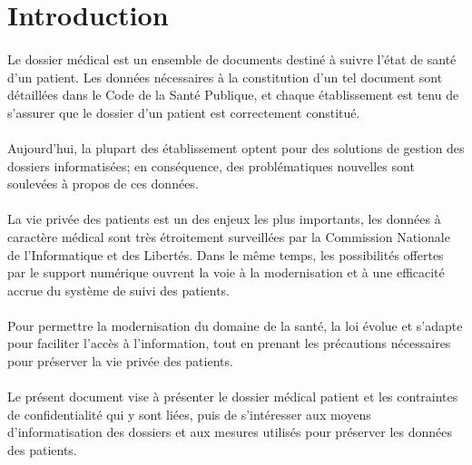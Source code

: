     \section*{Introduction}

\paragraph{}
Le dossier médical est un ensemble de documents destiné à suivre l'état de
santé d'un patient. Les données nécessaires à la constitution d'un tel document
sont détaillées dans le Code de la Santé Publique, et chaque établissement est
tenu de s'assurer que le dossier d'un patient est correctement constitué.

\paragraph{}
Aujourd'hui, la plupart des établissement optent pour des solutions de gestion
des dossiers informatisées; en conséquence, des problématiques nouvelles sont
soulevées à propos de ces données.

\paragraph{}
La vie privée des patients est un des enjeux les plus importants, les données à
caractère médical sont très étroitement surveillées par la Commission Nationale
de l'Informatique et des Libertés. Dans le même temps, les possibilités
offertes par le support numérique ouvrent la voie à la modernisation et à une
efficacité accrue du système de suivi des patients.

\paragraph{}
Pour permettre la modernisation du domaine de la santé, la loi évolue et
s'adapte pour faciliter l'accès à l'information, tout en prenant les
précautions nécessaires pour préserver la vie privée des patients.

\paragraph{}
Le présent document vise à présenter le dossier médical patient et les
contraintes de confidentialité qui y sont liées, puis de s'intéresser aux
moyens d'informatisation des dossiers et aux mesures utilisés pour préserver
les données des patients.

